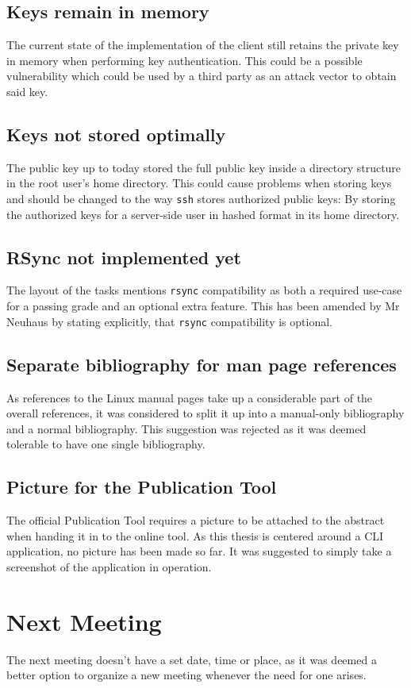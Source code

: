 \documentclass[10pt,a4paper,twoside,english,minutes]{zhawreprt}
\begin{document}
\subsection{Keys remain in memory}
The current state of the implementation of the client still retains the private key in memory when performing key authentication. This could be a possible vulnerability which could be used by a third party as an attack vector to obtain said key.

\subsection{Keys not stored optimally}
The public key up to today stored the full public key inside a directory structure in the root user's home directory. This could cause problems when storing keys and should be changed to the way \texttt{ssh} stores authorized public keys: By storing the authorized keys for a server-side user in hashed format in its home directory.

\subsection{RSync not implemented yet}
The layout of the tasks mentions \texttt{rsync} compatibility as both a required use-case for a passing grade and an optional extra feature. This has been amended by Mr Neuhaus by stating explicitly, that \texttt{rsync} compatibility is optional.

\subsection{Separate bibliography for man page references}
As references to the Linux manual pages take up a considerable part of the overall references, it was considered to split it up into a manual-only bibliography and a normal bibliography. This suggestion was rejected as it was deemed tolerable to have one single bibliography.

\subsection{Picture for the Publication Tool}
The official Publication Tool requires a picture to be attached to the abstract when handing it in to the online tool. As this thesis is centered around a CLI application, no picture has been made so far. It was suggested to simply take a screenshot of the application in operation.

\section*{Next Meeting}
The next meeting doesn't have a set date, time or place, as it was deemed a better option to organize a new meeting whenever the need for one arises.
\end{document}
